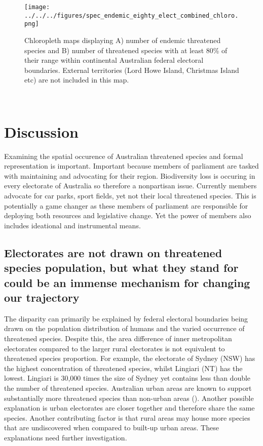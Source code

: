 \documentclass[a4paper,11pt]{article}
\begin{document}
\begin{figure}[H]
	\centering
    \texttt{[image: ../../../figures/spec\_endemic\_eighty\_elect\_combined\_chloro.png]}
    \caption{Chloropleth maps displaying A) number of endemic threatened species and B) number of threatened species with at least 80\% of their range within continental Australian federal electoral boundaries. External territories (Lord Howe Island, Christmas Island etc) are not included in this map.}
    \label{fig:combined_chloro}
\end{figure}

\\ 

\section{Discussion}

Examining the spatial occurence of Australian threatened species and formal representation is important. Important because members of parliament are tasked with maintaining and advocating for their region. Biodiversity loss is occuring in every electorate of Australia so therefore a nonpartisan issue. Currently members advocate for car parks, sport fields, yet not their local threatened species. This is potentially a game changer as these members of parliament are responsible for deploying both resources and legislative change. Yet the power of members also includes ideational and instrumental means. 

\subsection{Electorates are not drawn on threatened species population, but what they stand for could be an immense mechanism for changing our trajectory} 

The disparity can primarily be explained by federal electoral boundaries being drawn on the population distribution of humans and the varied occurrence of threatened species. Despite this, the area difference of inner metropolitan electorates compared to the larger rural electorates is not equivalent to threatened species proportion. For example, the electorate of Sydney (NSW) has the highest concentration of threatened species, whilst Lingiari (NT) has the lowest. Lingiari is 30,000 times the size of Sydney yet contains less than double the number of threatened species. Australian urban areas are known to support substantially more threatened species than non-urban areas (\cite{ivesCitiesAreHotspots2016, soanesConservationOpportunitiesThreatened2020}). Another possible explanation is urban electorates are closer together and therefore share the same species. Another contributing factor is that rural areas may house more species that are undiscovered when compared to built-up urban areas. These explanations need further investigation.
\end{document}

